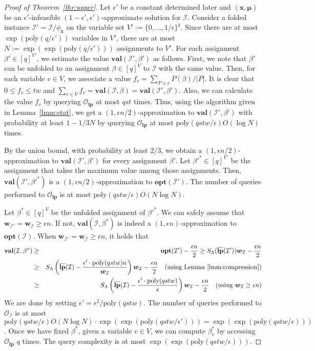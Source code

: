 \documentclass[letterpaper, 11pt]{article}
\newcommand{\calI}{\mathcal{I}}
\newcommand{\calO}{\mathcal{O}}
\newcommand{\biw}{\boldsymbol{w}}
\newcommand{\bix}{\boldsymbol{x}}
\newcommand{\bimu}{\boldsymbol{\mu}}
\newcommand{\lp}{\mathbf{lp}}
\newcommand{\opt}{\mathbf{opt}}
\newcommand{\val}{\mathbf{val}}
\newcommand{\ollp}{\overline{\mathbf{lp}}}
\newcommand{\poly}{\mathrm{poly}}
\begin{document}
\begin{proof}[Proof of Theorem~\ref{thr:upper}]
  Let $\epsilon'$ be a constant determined later and $(\bix,\bimu)$ be an $\epsilon'$-infeasible $(1-\epsilon',\epsilon')$-approximate solution for $\calI$.
  Consider a folded instance $\calI'=\calI/\phi_{\bix}$ on the variable set $V' := \{0,\ldots,1/\epsilon\}^q$.
  Since there are at most $\exp(\poly(q/\epsilon'))$ variables in $V'$,
  there are at most $N:=\exp(\exp(\poly(q/\epsilon')))$ assignments to $V'$.
  For each assignment $\beta' \in [q]^{V'}$, 
  we estimate the value $\val(\calI',\beta')$ as follows.
  First, we note that $\beta'$ can be unfolded to an assignment $\beta \in [q]^V$ to $\calI$ with the same value.
  Then, for each variable $v\in V$,
  we associate a value $f_v=\sum_{P\ni v}P(\beta)/|P|$.
  It is clear that $0\leq f_v \leq tw$ and $\sum_{v\in V}f_v=\val(\calI,\beta)=\val(\calI',\beta')$.
  Also, we can calculate the value $f_v$ by querying $\calO_{\lp}$ at most $qst$ times.
  Thus, using the algorithm given in Lemma~\ref{lmm:stat},
  we get a $(1,\epsilon n/2)$-approximation to $\val(\calI',\beta')$ with probability at least $1-1/3N$ by querying $\calO_{\lp}$ at most $\poly(qstw/\epsilon)O(\log N)$ times.

  By the union bound, 
  with probability at least $2/3$,
  we obtain a $(1,\epsilon n/2)$-approximation to $\val(\calI',\beta')$ for every assignment $\beta'$.
  Let $\beta'^* \in [q]^{V'}$ be the assignment that takes the maximum value among those assignments.
  Then, $\val(\calI',\beta'^*)$ is a $(1,\epsilon n/2)$-approximation to $\opt(\calI')$.
  The number of queries performed to $\calO_{\lp}$ is at most $\poly(qstw/\epsilon)O(N\log N)$.

  Let $\beta^* \in [q]^V$ be the unfolded assignment of $\beta'^*$.
  We can safely assume that $\biw_{\calI'} = \biw_{\calI} \geq \epsilon n$.
  If not, $\val(\calI,\beta^*)$ is indeed a $(1,\epsilon n)$-approximation to $\opt(\calI)$.
  When $\biw_{\calI'} = \biw_{\calI} \geq \epsilon n$, it holds that
  \begin{eqnarray*}
    \val(\calI,\beta^*) 
    &\geq &
    \opt(\calI')-\frac{\epsilon n }{2}
    \geq
    S_\Lambda(\ollp(\calI'))\biw_{\calI} - \frac{\epsilon n}{2}\\
    &\geq&
    S_{\Lambda}\left(\ollp(\calI)-\frac{\epsilon' \cdot \poly(qstw)n}{\biw_{\calI}}\right)\biw_{\calI} - \frac{\epsilon n}{2} \quad \text{(using Lemma~\ref{lmm:compression})}\\
    &\geq&
    S_{\Lambda}\left(\ollp(\calI)-\frac{\epsilon'\cdot \poly(qstw) }{\epsilon}\right)\biw_{\calI} - \frac{\epsilon n}{2} \quad \text{(using $\biw_{\calI} \geq \epsilon n$)}
  \end{eqnarray*}
  We are done by setting $\epsilon'=\epsilon^2/\poly(qstw)$.
  The number of queries performed to $\calO_{\calI}$ is at most
  \(
  \poly(qstw/\epsilon)O(N \log N)\cdot \exp(\exp(\poly(qstw/\epsilon'))) = \exp(\exp(\poly(qstw/\epsilon))) 
  \).
  Once we have fixed $\beta^*$, given a variable $v \in V$, we can compute $\beta^*_v$ by accessing $\calO_{\lp}$ $q$ times.
  The query complexity is at most $\exp(\exp(\poly(qstw/\epsilon)))$.
\end{proof}
\end{document}
